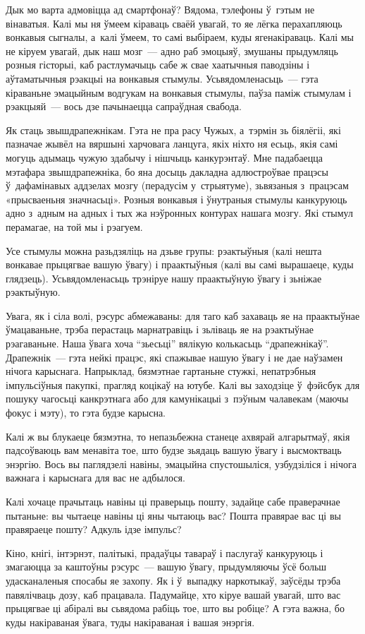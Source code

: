Дык мо варта адмовіцца ад смартфонаў? Вядома, тэлефоны ў~гэтым не вінаватыя. Калі мы ня ўмеем кіраваць сваёй увагай, то яе лёгка перахапляюць вонкавыя сыгналы, а~калі ўмеем, то самі выбіраем, куды ягенакіраваць. Калі мы не кіруем увагай, дык наш мозг~--- адно раб эмоцыяў, змушаны прыдумляць розныя гісторыі, каб растлумачыць сабе ж свае хаатычныя паводзіны і аўтаматычныя рэакцыі на вонкавыя стымулы. Усьвядомленасьць~--- гэта кіраваньне эмацыйным водгукам на вонкавыя стымулы, паўза паміж стымулам і рэакцыяй~--- вось дзе пачынаецца сапраўдная свабода.

Як стаць звышдрапежнікам. Гэта не пра расу Чужых, а~тэрмін зь біялёгіі, які пазначае жывёл на вяршыні харчовага ланцуга, якіх ніхто ня есьць, якія самі могуць адымаць чужую здабычу і нішчыць канкурэнтаў. Мне падабаецца мэтафара звышдрапежніка, бо яна досыць дакладна адлюстроўвае працэсы ў~дафамінавых аддзелах мозгу (перадусім у~стрыятуме), зьвязаныя з~працэсам «прысваеньня значнасьці». Розныя вонкавыя і ўнутраныя стымулы канкуруюць адно з~адным на адных і тых жа нэўронных контурах нашага мозгу. Які стымул перамагае, на той мы і рэагуем.

Усе стымулы можна разьдзяліць на дзьве групы: рэактыўныя (калі нешта вонкавае прыцягвае вашую ўвагу) і праактыўныя (калі вы самі вырашаеце, куды глядзець). Усьвядомленасьць трэніруе нашу праактыўную ўвагу і зьніжае рэактыўную.

Увага, як і сіла волі, рэсурс абмежаваны: для таго каб захаваць яе на праактыўнае ўмацаваньне, трэба перастаць марнатравіць і зьліваць яе на рэактыўнае рэагаваньне. Наша ўвага хоча ``зьесьці'' вялікую колькасьць ``драпежнікаў''. Драпежнік~--- гэта нейкі працэс, які спажывае нашую ўвагу і не дае наўзамен нічога карыснага. Напрыклад, бязмэтнае гартаньне стужкі, непатрэбныя імпульсіўныя пакупкі, прагляд коцікаў на ютубе. Калі вы заходзіце ў~фэйсбук для пошуку чагосьці канкрэтнага або для камунікацыі з~пэўным чалавекам (маючы фокус і мэту), то гэта будзе карысна.

Калі ж вы блукаеце бязмэтна, то непазьбежна станеце ахвярай алгарытмаў, якія падсоўваюць вам менавіта тое, што будзе зьядаць вашую ўвагу і высмоктваць энэргію. Вось вы паглядзелі навіны, эмацыйна спустошыліся, узбудзіліся і нічога важнага і карыснага для вас не адбылося. 

Калі хочаце прачытаць навіны ці праверыць пошту, задайце сабе праверачнае пытаньне: вы чытаеце навіны ці яны чытаюць вас? Пошта правярае вас ці вы правяраеце пошту? Адкуль ідзе імпульс?

Кіно, кнігі, інтэрнэт, палітыкі, прадаўцы тавараў і паслугаў канкуруюць і змагаюцца за каштоўны рэсурс~--- вашую ўвагу, прыдумляючы ўсё больш удасканаленыя спосабы яе захопу. Як і ў~выпадку наркотыкаў, заўсёды трэба павялічваць дозу, каб працавала. Падумайце, хто кіруе вашай увагай, што вас прыцягвае ці абіралі вы сьвядома рабіць тое, што вы робіце? А гэта важна, бо куды накіраваная ўвага, туды накіраваная і вашая энэргія.

